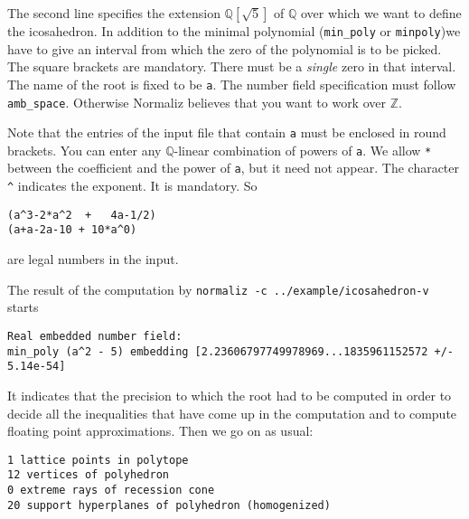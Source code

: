 \documentclass[12pt,a4paper]{scrartcl}
\theoremstyle{definition}
\def\ZZ{{\mathbb Z}}
\def\QQ{{\mathbb Q}}
\begin{document}
{\begin{minipage}[t]{0.4\textwidth}
\end{minipage}

The second line specifies the extension $\QQ[\sqrt 5]$ of $\QQ$ over which we want to define the icosahedron. In addition to the minimal polynomial (\verb|min_poly| or \verb|minpoly|)we have to give an interval from which the zero of the polynomial is to be picked. The square brackets are mandatory. There must be a \emph{single} zero in that interval. The name of the root is fixed to be \verb|a|. The number field specification must follow \verb|amb_space|. Otherwise Normaliz believes that you want to work over $\ZZ$. 

Note that the entries of the input file that contain \verb|a| must be enclosed in round brackets. You can enter any $\QQ$-linear combination of powers of \verb|a|. We allow \verb|*| between the coefficient and the power of \verb|a|, but it need not appear. The character \verb|^| indicates the exponent. It is mandatory. So
\begin{Verbatim}
(a^3-2*a^2  +   4a-1/2)
(a+a-2a-10 + 10*a^0)
\end{Verbatim}
are legal numbers in the input.

The result of the computation by \verb|normaliz -c ../example/icosahedron-v| starts
\begin{Verbatim}
Real embedded number field:
min_poly (a^2 - 5) embedding [2.23606797749978969...1835961152572 +/- 5.14e-54]
\end{Verbatim}
It indicates that the precision to which the root had to be computed in order to decide all the inequalities that have come up in the computation and to compute floating point approximations. Then we go on as usual:

\begin{Verbatim}
1 lattice points in polytope
12 vertices of polyhedron
0 extreme rays of recession cone
20 support hyperplanes of polyhedron (homogenized)


\end{Verbatim}}
\end{document}
